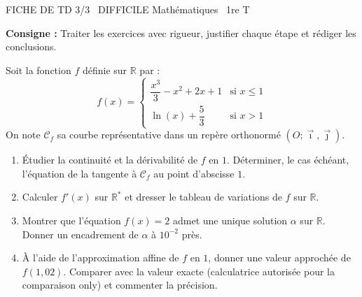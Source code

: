 \documentclass[11pt]{article}
\begin{document}
\begin{tcolorbox}[enhanced,colback=popink,colframe=popink,arc=10pt,boxrule=0pt,left=12pt,right=12pt,top=9pt,bottom=9pt]
{\color{white}\popxbold\small FICHE DE TD 3/3 \textbullet\ DIFFICILE \hfill Mathématiques \textbullet\ 1re T\par}
\end{tcolorbox}
\vspace{4pt}
\noindent \textbf{Consigne :} Traiter les exercices avec rigueur, justifier chaque étape et rédiger les conclusions.

\begin{exercice}
Soit la fonction $f$ définie sur $\mathbb{R}$ par :
\[
f(x) = \begin{cases}
\dfrac{x^3}{3} - x^2 + 2x + 1 & \text{si } x \leq 1 \\[1em]
\ln(x) + \dfrac{5}{3} & \text{si } x > 1
\end{cases}
\]
On note $\mathcal{C}_f$ sa courbe représentative dans un repère orthonormé $(O;\vec{\imath},\vec{\jmath})$.
\begin{enumerate}
    \item Étudier la continuité et la dérivabilité de $f$ en $1$. Déterminer, le cas échéant, l'équation de la tangente à $\mathcal{C}_f$ au point d'abscisse $1$.
    \item Calculer $f'(x)$ sur $\mathbb{R}^*$ et dresser le tableau de variations de $f$ sur $\mathbb{R}$.
    \item Montrer que l'équation $f(x) = 2$ admet une unique solution $\alpha$ sur $\mathbb{R}$. Donner un encadrement de $\alpha$ à $10^{-2}$ près.
    \item À l'aide de l'approximation affine de $f$ en $1$, donner une valeur approchée de $f(1,02)$. Comparer avec la valeur exacte (calculatrice autorisée pour la comparaison only) et commenter la précision.
\end{enumerate}
\end{exercice}
\end{document}
